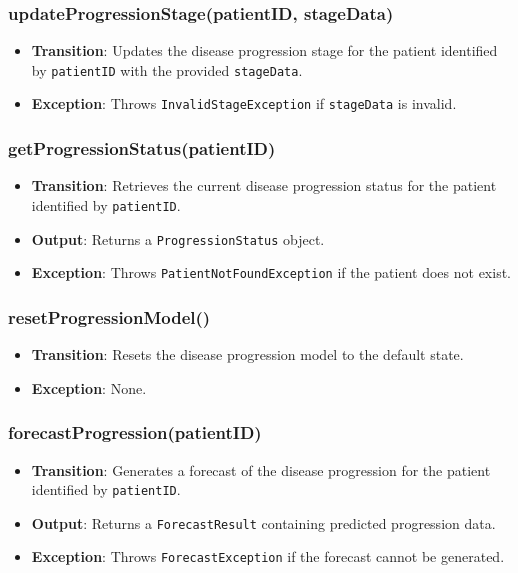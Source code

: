 \documentclass[12pt, titlepage]{article}
\begin{document}
\subsubsection{updateProgressionStage(patientID, stageData)}
\begin{itemize}
    \item \textbf{Transition}: Updates the disease progression stage for the patient identified by \texttt{patientID} with the provided \texttt{stageData}.
    \item \textbf{Exception}: Throws \texttt{InvalidStageException} if \texttt{stageData} is invalid.
\end{itemize}

\subsubsection{getProgressionStatus(patientID)}
\begin{itemize}
    \item \textbf{Transition}: Retrieves the current disease progression status for the patient identified by \texttt{patientID}.
    \item \textbf{Output}: Returns a \texttt{ProgressionStatus} object.
    \item \textbf{Exception}: Throws \texttt{PatientNotFoundException} if the patient does not exist.
\end{itemize}

\subsubsection{resetProgressionModel()}
\begin{itemize}
    \item \textbf{Transition}: Resets the disease progression model to the default state.
    \item \textbf{Exception}: None.
\end{itemize}

\subsubsection{forecastProgression(patientID)}
\begin{itemize}
    \item \textbf{Transition}: Generates a forecast of the disease progression for the patient identified by \texttt{patientID}.
    \item \textbf{Output}: Returns a \texttt{ForecastResult} containing predicted progression data.
    \item \textbf{Exception}: Throws \texttt{ForecastException} if the forecast cannot be generated.
\end{itemize}
\end{document}
